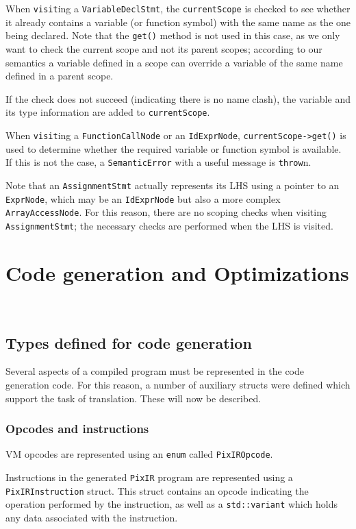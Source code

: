 \documentclass[11pt,a4paper]{scrartcl}
\begin{document}
When \verb|visit|ing a \verb|VariableDeclStmt|, the \verb|currentScope| is checked to see whether it already contains a variable (or function symbol) with the same name as the one being declared. Note that the \verb|get()| method is not used in this case, as we only want to check the current scope and not its parent scopes; according to our semantics a variable defined in a scope can override a variable of the same name defined in a parent scope.

If the check does not succeed (indicating there is no name clash), the variable and its type information are added to \verb|currentScope|.

When \verb|visit|ing a \verb|FunctionCallNode| or an \verb|IdExprNode|, \verb|currentScope->get()| is used to determine whether the required variable or function symbol is available. If this is not the case, a \verb|SemanticError| with a useful message is \verb|throw|n.

Note that an \verb|AssignmentStmt| actually represents its LHS using a pointer to an \verb|ExprNode|, which may be an \verb|IdExprNode| but also a more complex \verb|ArrayAccessNode|. For this reason, there are no scoping checks when visiting \verb|AssignmentStmt|; the necessary checks are performed when the LHS is visited.

\newpage

\section{Code generation and Optimizations}~\label{sec:codegen}

\subsection{Types defined for code generation}

Several aspects of a compiled program must be represented in the code generation code. For this reason, a number of auxiliary structs were defined which support the task of translation. These will now be described.

\subsubsection{Opcodes and instructions}

VM opcodes are represented using an \verb|enum| called \verb|PixIROpcode|.

Instructions in the generated \verb|PixIR| program are represented using a \verb|PixIRInstruction| struct. This struct contains an opcode indicating the operation performed by the instruction, as well as a \verb|std::variant| which holds any data associated with the instruction.
\end{document}
